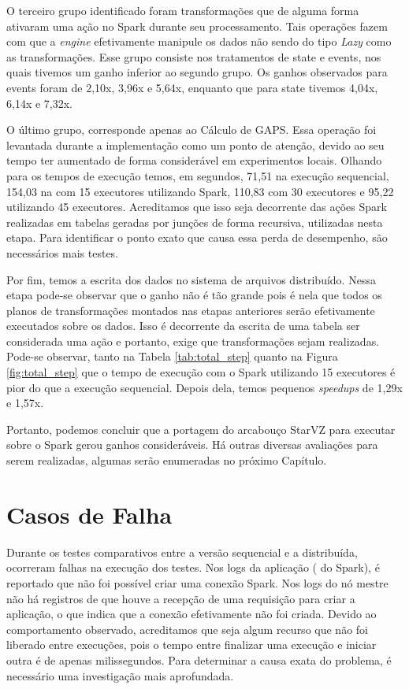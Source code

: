 O terceiro grupo identificado foram transformações que de alguma forma ativaram 
uma ação no Spark durante seu processamento. Tais operações fazem com que a 
\textit{engine} efetivamente manipule os dados \cite{ref:sparkbook} não sendo 
do tipo \textit{Lazy} como as transformações. Esse grupo consiste nos 
tratamentos de state e events, nos quais tivemos um ganho inferior ao segundo 
grupo. Os ganhos observados para events foram de 2,10x, 3,96x e 5,64x, enquanto 
que para state tivemos 4,04x, 6,14x e 7,32x.

O último grupo, corresponde apenas ao Cálculo de GAPS. Essa operação foi 
levantada durante a implementação como um ponto de atenção, devido ao seu tempo 
ter aumentado de forma considerável em experimentos locais. Olhando para os 
tempos de execução temos, em segundos, 71,51 na execução sequencial, 154,03 na 
com 15 executores utilizando Spark, 110,83 com 30 executores e 95,22 utilizando 
45 executores. Acreditamos que isso seja decorrente das ações Spark realizadas 
em tabelas geradas por junções de forma recursiva, utilizadas nesta etapa. Para 
identificar o ponto exato que causa essa perda de desempenho, são necessários 
mais testes.

Por fim, temos a escrita dos dados no sistema de arquivos distribuído. Nessa 
etapa pode-se observar que o ganho não é tão grande pois é nela que todos os 
planos de transformações montados nas etapas anteriores serão efetivamente 
executados sobre os dados. Isso é decorrente da escrita de uma tabela ser
considerada uma ação e portanto, exige que transformações sejam realizadas.
Pode-se observar, tanto na Tabela 
\ref{tab:total_step} quanto na Figura \ref{fig:total_step} que o tempo de 
execução com o Spark utilizando 15 executores é pior do que a execução 
sequencial. Depois dela, temos pequenos \textit{speedups} de 1,29x e 1,57x.

Portanto, podemos concluir que a portagem do arcabouço StarVZ para executar 
sobre o Spark gerou ganhos consideráveis. Há outras diversas avaliações para 
serem realizadas, algumas serão enumeradas no próximo Capítulo.


\section{Casos de Falha} \label{sect:failures}

Durante os testes comparativos entre a versão sequencial e a distribuída, 
ocorreram falhas na execução dos testes. Nos logs da aplicação 
( do Spark), é reportado que não foi possível criar 
uma conexão Spark. Nos logs do nó mestre não há registros de que houve a 
recepção de uma requisição para criar a aplicação, o que indica que a conexão 
efetivamente não foi criada. Devido ao comportamento observado, acreditamos que 
seja algum recurso que não foi liberado entre execuções, pois o tempo entre 
finalizar uma execução e iniciar outra é de apenas milissegundos. Para 
determinar a causa exata do problema, é necessário uma investigação mais 
aprofundada.

